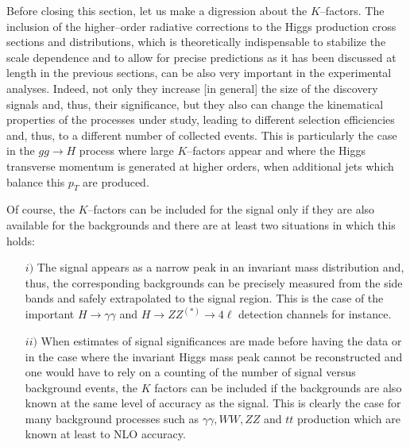 Before closing this section, let us make a digression about the $K$--factors. 
The inclusion of the higher--order radiative corrections to the Higgs production
cross sections and distributions, which is theoretically indispensable to
stabilize the scale dependence and to allow for precise predictions as it has
been discussed at length in the previous sections, can be also very important
in the experimental analyses. Indeed, not only they increase [in general] the
size of the discovery signals and, thus, their significance, but they also can
change the kinematical properties of the processes under study, leading to
different selection efficiencies and, thus, to a different number of collected
events. This is particularly the case in the $gg\to H$ process where large 
$K$--factors appear and where the Higgs transverse momentum is generated at 
higher orders, when additional jets which balance this $p_T$ are produced.\s

Of course, the $K$--factors can be included for the signal only if they are also
available for the backgrounds and there are at least two situations in which 
this holds: 

\begin{itemize}
\vspace*{-2mm}
\item[$i)$] The signal appears as a narrow peak in an invariant mass 
distribution and, thus, the corresponding backgrounds can be precisely measured
from the side bands and safely extrapolated to the signal region. This is the 
case of the important $H \to \gamma \gamma$ and $H \to ZZ^{(*)} \to 4\ell$ 
detection channels for instance.  
\vspace*{-2mm}

\item[$ii)$] When estimates of signal significances are made before having the
data or in the case where the invariant Higgs mass peak cannot be 
reconstructed and one would have to rely on a counting of the number of signal 
versus background events, the $K$ factors can be included if the backgrounds 
are also known at the same level of accuracy as the signal. This is clearly 
the case for many background processes such as $\gamma \gamma, WW, ZZ$ and 
$tt$ production which are known at least to NLO accuracy.\s 
\vspace*{-2mm}
\end{itemize}


